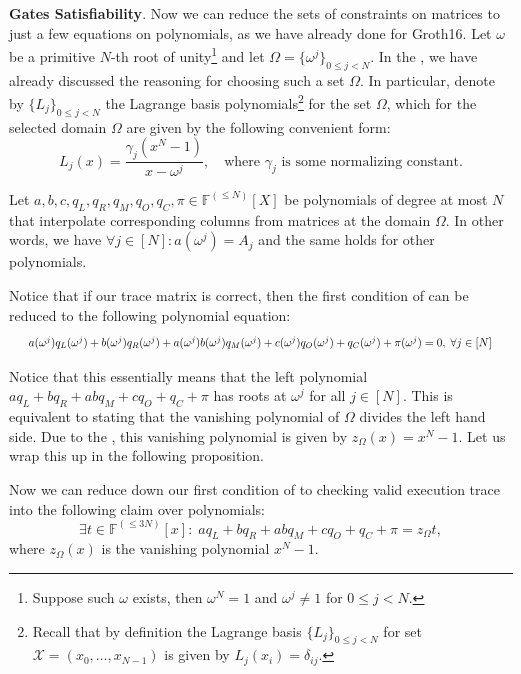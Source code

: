 \documentclass[../../book.tex]{subfiles}
\begin{document}
\textcolor{blue!80!black}{\textbf{Gates Satisfiability}.} Now we can reduce the
sets of constraints on matrices to just a few equations on polynomials, as we
have already done for Groth16. Let $\omega$ be a primitive $N$-th root of
unity\footnote{Suppose such $\omega$ exists, then $\omega^N = 1$ and $\omega^j
\neq 1$ for $0 \le j < N$.} and let $\Omega = \{\omega^j\}_{0 \leq j < N}$. In
the , we have already discussed the reasoning for choosing
such a set $\Omega$. In particular, denote by $\{L_j\}_{0 \leq j < N}$ the
Lagrange basis polynomials\footnote{Recall that by definition the Lagrange basis
$\{L_j\}_{0 \leq j < N}$ for set $\mathcal{X}=(x_0,\dots,x_{N-1})$ is given by
$L_j(x_i) = \delta_{ij}$.} for the set $\Omega$, which for the selected domain
$\Omega$ are given by the following convenient form:
\begin{equation*}
    L_j(x) = \frac{\gamma_j(x^N - 1)}{x-\omega^j}, \quad \text{where $\gamma_j$ is some normalizing constant.}
\end{equation*}

Let $a, b, c, q_L, q_R, q_M, q_O, q_C, \pi \in \mathbb{F}^{(\leq N)}[X]$ be
polynomials of degree at most $N$ that interpolate corresponding columns from
matrices at the domain $\Omega$. In other words, we have \(\forall j \in [N]:
a(\omega^j) = A_j\) and the same holds for other polynomials.

Notice that if our trace matrix is correct, then the first condition of
 can be reduced to the following polynomial
equation:
\begin{equation*}
    \scalebox{0.8}{$
        a(\omega^j)q_L(\omega^j) + b(\omega^j)q_R(\omega^j) + a(\omega^j)b(\omega^j)q_M(\omega^j) + c(\omega^j)q_O(\omega^j) + q_C(\omega^j) + \pi(\omega^j) = 0, \; \forall j \in [N]
    $}
\end{equation*}

Notice that this essentially means that the left polynomial $aq_L + bq_R + abq_M
+ cq_O + q_C + \pi$ has roots at $\omega^j$ for all $j \in [N]$. This is
equivalent to stating that the vanishing polynomial of $\Omega$ divides the left
hand side. Due to the , this vanishing
polynomial is given by $z_{\Omega}(x) = x^N-1$.  Let us wrap this up in the
following proposition.

\begin{proposition}
    Now we can reduce down our first condition of 
    to checking valid execution trace into the following claim over polynomials:
    \[\exists t \in \mathbb{F}^{(\leq 3N)}[x]: \; aq_L + bq_R + abq_M + cq_O + q_C + \pi = z_{\Omega}t,\]
    where $z_{\Omega}(x)$ is the vanishing polynomial $x^N - 1$.
\end{proposition}
\end{document}
